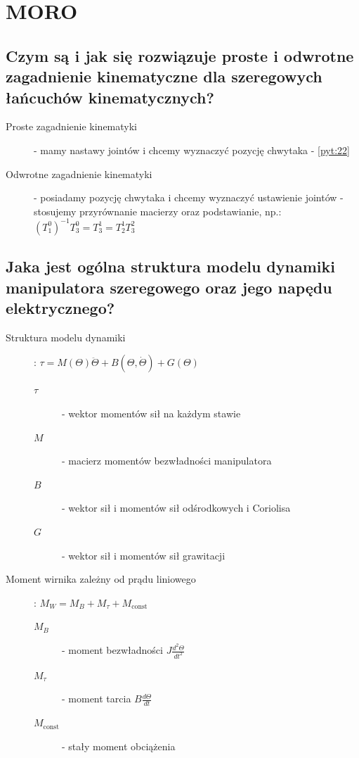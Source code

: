 \section{MORO}
\subsection{Czym są i jak się rozwiązuje proste i odwrotne zagadnienie kinematyczne dla szeregowych łańcuchów kinematycznych?}
\begin{description}
    \item[Proste zagadnienie kinematyki] - mamy nastawy jointów i chcemy wyznaczyć pozycję chwytaka - \ref{pyt:22}
    \item[Odwrotne zagadnienie kinematyki] - posiadamy pozycję chwytaka i chcemy wyznaczyć ustawienie jointów - stosujemy przyrównanie macierzy oraz podstawianie, np.: $(T^0_1)^{-1}T^0_3 = T^1_3 = T^1_2T^2_3$
\end{description}

\subsection{Jaka jest ogólna struktura modelu dynamiki manipulatora szeregowego oraz jego napędu elektrycznego?}
\begin{description}
    \item[Struktura modelu dynamiki]: $\tau = M(\Theta)\ddot{\Theta}+B(\Theta,\dot{\Theta})+G(\Theta)$\mbox{}
    \begin{description}
        \item[$\tau$] - wektor momentów sił na każdym stawie
        \item[$M$] - macierz momentów bezwładności manipulatora
        \item[$B$] - wektor sił i momentów sił odśrodkowych i Coriolisa
        \item[$G$] - wektor sił i momentów sił grawitacji
    \end{description}
    \item[Moment wirnika zależny od prądu liniowego]: $M_W = M_B+M_\tau+M_{\mathrm{const}}$\mbox{}
    \begin{description}
        \item[$M_B$] - moment bezwładności $J\frac{d^2\Theta}{dt^2}$
        \item[$M_\tau$] - moment tarcia $B\frac{d\Theta}{dt}$
        \item[$M_{\mathrm{const}}$] - stały moment obciążenia
    \end{description}
\end{description}

